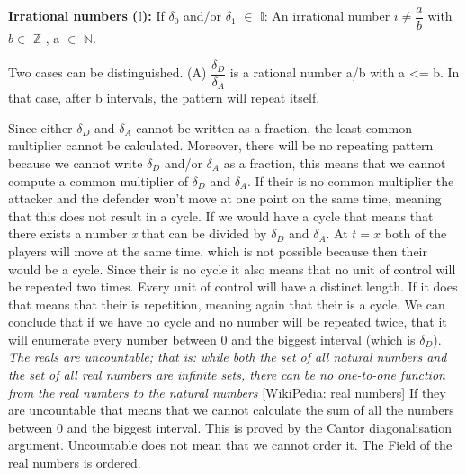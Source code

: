 \textbf{Irrational numbers (\(\mathbb{I}\)):} If $\delta_{0}$ and/or $\delta_{1}$ $\in$ \(\mathbb{I}\):
An irrational number $ i \neq \dfrac{a}{b}$ with $b \in$ \(\mathbb{Z}\) , a $\in$ \(\mathbb{N}\).

Two cases can be distinguished.
(A) $\dfrac{\delta_{D}}{ \delta_{A}}$ is a rational number a/b with a <= b. In that case, after b intervals, the pattern will repeat itself.

Since either $\delta_{D}$ and $\delta_{A}$ cannot be written as a fraction, the least common multiplier cannot be calculated. Moreover, there will be no repeating pattern because we cannot write $\delta_{D}$ and/or $\delta_{A}$ as a fraction, this means that we cannot compute a common multiplier of $\delta_{D}$ and $\delta_{A}$. If their is no common multiplier the attacker and the defender won't move at one point on the same time, meaning that this does not result in a cycle. If we would have a cycle that means that there exists a number \textit{x} that can be divided by $\delta_{D}$ and $\delta_{A}$. At $t=x$ both of the players will move at the same time, which is not possible because then their would be a cycle. Since their is no cycle it also means that no unit of control will be repeated two times. Every unit of control will have a distinct length. If it does that means that their is repetition, meaning again that their is a cycle.  We can conclude that if we have no cycle and no number will be repeated twice, that it will enumerate every number between 0 and the biggest interval (which is $\delta_{D}$). 
\textit{The reals are uncountable; that is: while both the set of all natural numbers and the set of all real numbers are infinite sets, there can be no one-to-one function from the real numbers to the natural numbers} [WikiPedia: real numbers] If they are uncountable that means that we cannot calculate the sum of all the numbers between 0 and the biggest interval. This is proved by the Cantor diagonalisation argument. Uncountable does not mean that we cannot order it. The Field of the real numbers is ordered. 


